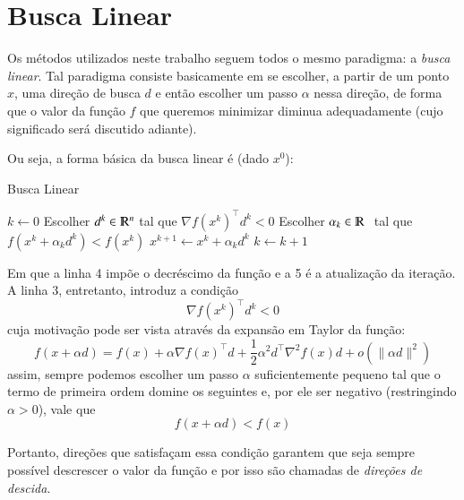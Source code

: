 \documentclass[a4paper,11pt]{article}
\begin{document}
    \newpage
    \section*{Busca Linear}
        Os métodos utilizados neste trabalho seguem todos o mesmo paradigma: a \emph{busca linear}.
        Tal paradigma consiste basicamente em se escolher, a partir de um ponto $x$, uma direção de busca $d$ e então escolher
        um passo $\alpha$ nessa direção, de forma que o valor da função $f$ que queremos
        minimizar diminua adequadamente (cujo significado será discutido adiante).

        Ou seja, a forma básica da busca linear é (dado $x^0$):
        \begin{algorithm}[h]
            \caption{Busca Linear}
            \label{alg:ls}
            \begin{algorithmic}[1]
                \State $k \gets 0$
                    \State Escolher $d^k \in \varmathbb{R}^n$ tal que $\nabla f(x^k)^\top d^k < 0$
                    \State Escolher $\alpha_k \in \varmathbb{R}$\,\, tal que $f(x^k + \alpha_k d^k) < f(x^k)$
                    \State $x^{k+1} \gets x^k + \alpha_k d^k$
                    \State $k \gets k + 1$
                \EndWhile
            \end{algorithmic}
        \end{algorithm}

        Em que a linha 4 impõe o decréscimo da função e a 5 é a atualização da iteração.
        A linha 3, entretanto, introduz a condição
            $$ \nabla f(x^k)^\top d^k < 0 $$
        cuja motivação pode ser vista através da expansão em Taylor da função:
            $$ f(x + \alpha d) = f(x) + \alpha\nabla f(x)^\top d + \frac{1}{2}\alpha^2d^\top\nabla^2 f(x)d + o(\|\alpha d\|^2)  $$
        assim, sempre podemos escolher um passo $\alpha$ suficientemente pequeno tal que o termo de primeira ordem domine os seguintes
        e, por ele ser negativo (restringindo $\alpha > 0$), vale que
            $$ f(x + \alpha d) < f(x) $$

        Portanto, direções que satisfaçam essa condição garantem que seja sempre possível descrescer o valor da função e por isso
        são chamadas de \emph{direções de descida}.
\end{document}
